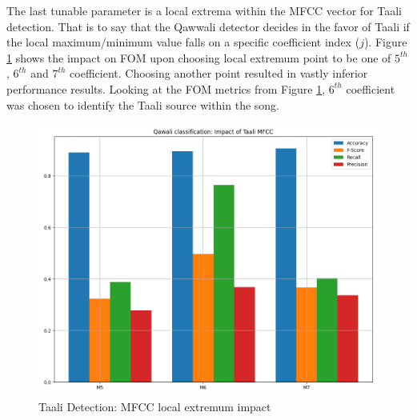\documentclass{article}
\begin{document}
The last tunable parameter is a local extrema within the MFCC vector for Taali detection. That is to say that the Qawwali detector decides in the favor of Taali if the local maximum/minimum value falls on a specific coefficient index ($j$). Figure \ref{fig:src_mfcc} shows the impact on FOM upon choosing local extremum point to be one of $5^{th}$, $6^{th}$ and $7^{th}$ coefficient. Choosing another point resulted in vastly inferior performance results. Looking at the FOM metrics from Figure \ref{fig:src_mfcc}, $6^{th}$ coefficient was chosen to identify the Taali source within the song.
\begin{figure}[htbp]
  \centering
  \includegraphics[scale=0.75, width=0.95\columnwidth]{taali_mfcc}
  \caption{Taali Detection: MFCC local extremum impact}
\label{fig:src_mfcc}
\end{figure}
\end{document}
